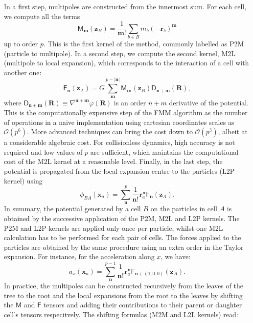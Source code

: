 In a first step, multipoles are constructed from the
innermost sum. For each cell, we compute all the terms
\begin{equation}
  \mathsf{M}_{\mathbf{m}}(\mathbf{z}_B) = \frac{1}{\mathbf{m}!}
  \sum_{b\in B} m_b\left(-\mathbf{r}_b\right)^\mathbf{m} \label{eq:fmm:P2M} 
\end{equation}
up to order $p$. This is the first kernel of the method, commonly
labelled as \textsc{P2M} (particle to multipole). In a second step, we
compute the second kernel, \textsc{M2L} (multipole to local
expansion), which corresponds to the interaction of a cell with
another one:
\begin{equation}
  \mathsf{F}_{\mathbf{n}}(\mathbf{z}_A) = G\sum_{\mathbf{m}}^{p -|\mathbf{n}|}
  \mathsf{M}_{\mathbf{m}}(\mathbf{z}_B)
  \mathsf{D}_{\mathbf{n}+\mathbf{m}}(\mathbf{R}), \label{eq:fmm:M2L} 
\end{equation}
where $\mathsf{D}_{\mathbf{n}+\mathbf{m}}(\mathbf{R}) \equiv
\nabla^{\mathbf{n}+\mathbf{m}} \varphi(\mathbf{R})$ is an order $n+m$
derivative of the potential. This is the computationally expensive
step of the FMM algorithm as the number of operations in a naive
implementation using cartesian coordinates scales as
$\mathcal{O}(p^6)$. More advanced techniques
\citep[e.g.][]{Dehnen2014} can bring the cost down to
$\mathcal{O}(p^3)$, albeit at a considerable algebraic cost. For
collisionless dynamics, high accuracy is not required and low values
of $p$ are sufficient, which maintains the computational cost of the
M2L kernel at a reasonable level.  
Finally, in the last step, the potential is propagated from the local
expansion centre to the particles (L2P kernel) using
\begin{equation}
  \phi_{BA}(\mathbf{x}_a) = \sum_{\mathbf{n}}^{p}
  \frac{1}{\mathbf{n}!} \mathbf{r}_a^{\mathbf{n}}
  \mathsf{F}_{\mathbf{n}}(\mathbf{z}_A). \label{eq:fmm:L2P} 
\end{equation}
In summary, the potential generated by a cell $B$ on the particles in
cell $A$ is obtained by the successive application of the P2M, M2L and
L2P kernels. The P2M and L2P kernels are applied only once per
particle, whilst one M2L calculation has to be performed for each pair
of cells. The forces applied to the particles are obtained by the same
procedure using an extra order in the Taylor expansion. For instance,
for the acceleration along $x$, we have:
\begin{equation}
  a_x(\mathbf{x}_a) = \sum_{\mathbf{n}}^{p-1}
  \frac{1}{\mathbf{n}!} \mathbf{r}_a^{\mathbf{n}}
  \mathsf{F}_{\mathbf{n}+\left(1,0,0\right)}(\mathbf{z}_A). \label{eq:fmm:L2P_force} 
\end{equation}
In practice, the multipoles can be constructed recursively from the
leaves of the tree to the root and the local expansions from the root
to the leaves by shifting the $\mathsf{M}$ and $\mathsf{F}$ tensors
and adding their contributions to their parent or daughter cell's
tensors respecitvely. The shifting formulas (M2M and L2L kernels)
read:

